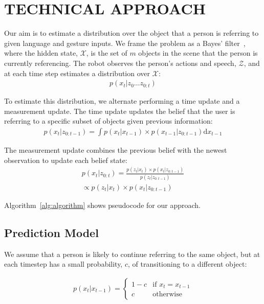 \documentclass[letterpaper, 10 pt, conference]{ieeeconf}
\newcommand{\stnote}[1]{\textcolor{Blue}{\textbf{ST: #1}}}
\begin{document}
\section{TECHNICAL APPROACH}



Our aim is to estimate a distribution over the object that a person is
referring to given language and gesture inputs.  We frame the problem
as a Bayes' filter~\citep{thrun08}, where the hidden state,
$\mathcal{X}$, is the set of $m$ objects in the scene that the person
is currently referencing. The robot observes the person's actions and
speech, $\mathcal{Z}$, and at each time step estimates a distribution
over $\mathcal{X}$:
\begin{align}
  p(x_t | z_0 \dots z_{0:t})
\end{align}


To estimate this distribution, we alternate performing a time update
and a measurement update.  The time update updates the belief that the
user is referring to a specific subset of objects given previous
information:
\begin{align}
p(x_t | z_{0:t-1}) = \int p(x_t|x_{t-1})\times p(x_{t-1} | z_{0:t-1}) \text{d}x_{t-1}
\end{align}

The measurement update combines the previous belief with the newest observation to update each belief state: 
\begin{align}
p(x_t |z_{0:t}) = \frac{p(z_t | x_t) \times p(x_t | z_{0:t-1})}{p(z_t | z_{0:t-1})} \\\propto p(z_t | x_t) \times p(x_t | z_{0:t-1})
\end{align}

Algorithm~\ref{alg:algorithm} shows pseudocode for our approach.


\subsection{Prediction Model}

We assume that a person is likely to continue referring to the same
object, but at each timestep has a small probability, $c$, of
transitioning to a different object: 

\begin{align}
p(x_t | x_{t-1}) = \left\{  \begin{array}{ll}
1-c &\mbox{if } x_t = x_{t-1}\\
c &\mbox{otherwise}
\end{array}\right.
\end{align}
\end{document}
